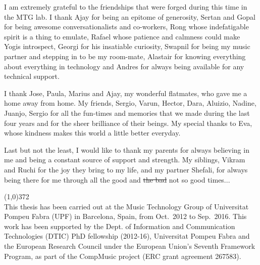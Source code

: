 I am extremely grateful to the friendships that were forged during this time in the MTG lab. I thank Ajay for being an epitome of generosity, Sertan and Gopal for being awesome conversationalists and co-workers, Rong whose indefatigable spirit is a thing to emulate, Rafael whose patience and calmness could make Yogis introspect, Georgi for his insatiable curiosity, Swapnil for being my music partner and stepping in to be my room-mate, Alastair for knowing everything about everything in technology and Andres for always being available for any technical support.

I thank Jose, Paula, Marius and Ajay, my wonderful flatmates, who gave me a home away from home. My friends, Sergio, Varun, Hector, Dara, Aluizio, Nadine, Juanjo, Sergio for all the fun-times and memories that we made during the last four years and for the sheer brilliance of their beings. My special thanks to Eva, whose kindness makes this world a little better everyday.

Last but not the least, I would like to thank my parents for always believing in me and being a constant source of support and strength. My siblings, Vikram and Ruchi for the joy they bring to my life, and my partner Shefali, for always being there for me through all the good and \st{the bad} not so good times...



\vspace*{\fill}

\line(1,0){372}\\
\footnotesize
This thesis has been carried out at the Music Technology Group of Universitat Pompeu Fabra (UPF) in Barcelona, Spain, from Oct.~2012 to Sep.~2016. This work has been supported by the Dept. of Information and Communication Technologies (DTIC) PhD fellowship (2012-16), Universitat Pompeu Fabra and the European Research Council under the European Union’s Seventh Framework Program, as part of the CompMusic project (ERC grant agreement 267583).
\normalsize